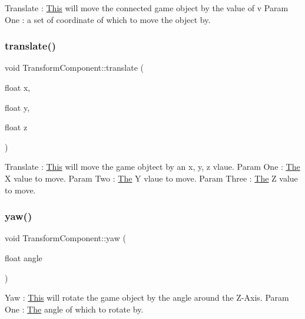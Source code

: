 Translate \+: \mbox{\hyperlink{class_this}{This}} will move the connected game object by the value of \textquotesingle{}v\textquotesingle{} Param One \+: a set of coordinate of which to move the object by. \mbox{\label{class_transform_component_af495b5a63ba61ac9f67170ecf30769ac}} 
\subsubsection{\texorpdfstring{translate()}{translate()}\hspace{0.1cm}{\footnotesize\ttfamily [2/2]}}
{\footnotesize\ttfamily void Transform\+Component\+::translate (\begin{DoxyParamCaption}\item[{float}]{x,  }\item[{float}]{y,  }\item[{float}]{z }\end{DoxyParamCaption})\hspace{0.3cm}{\ttfamily [inline]}}

Translate \+: \mbox{\hyperlink{class_this}{This}} will move the game objtect by an x, y, z vlaue. Param One \+: \mbox{\hyperlink{class_the}{The}} X value to move. Param Two \+: \mbox{\hyperlink{class_the}{The}} Y vlaue to move. Param Three \+: \mbox{\hyperlink{class_the}{The}} Z value to move. \mbox{\label{class_transform_component_ae32c6f3f18b81fc712629fb689d61252}} 
\subsubsection{\texorpdfstring{yaw()}{yaw()}}
{\footnotesize\ttfamily void Transform\+Component\+::yaw (\begin{DoxyParamCaption}\item[{float}]{angle }\end{DoxyParamCaption})\hspace{0.3cm}{\ttfamily [inline]}}

Yaw \+: \mbox{\hyperlink{class_this}{This}} will rotate the game object by the angle around the Z-\/\+Axis. Param One \+: \mbox{\hyperlink{class_the}{The}} angle of which to rotate by. 

